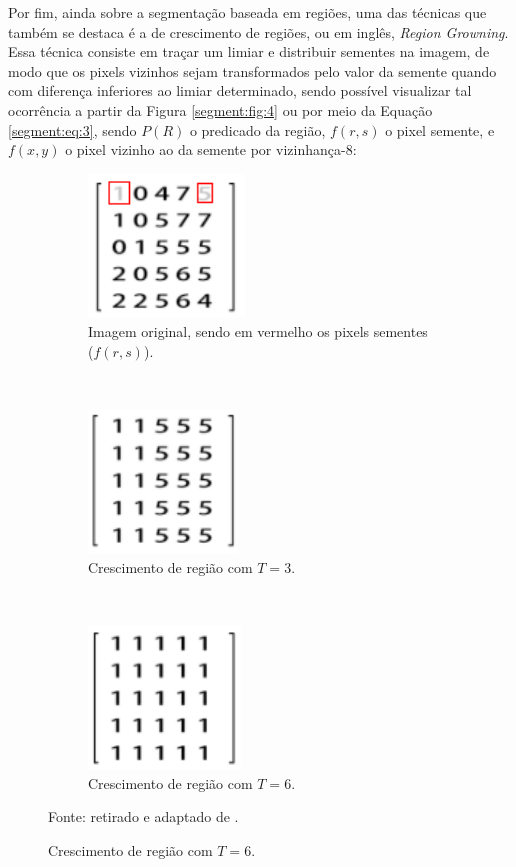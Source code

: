 Por fim, ainda sobre a segmentação baseada em regiões, uma das técnicas que também se destaca é a de crescimento de regiões, ou em inglês, \textit{Region Growning}. Essa técnica consiste em traçar um limiar e distribuir sementes na imagem, de modo que os pixels vizinhos sejam transformados pelo valor da semente quando com diferença inferiores ao limiar determinado, sendo possível visualizar tal ocorrência a partir da Figura \ref{segment:fig:4} ou por meio da Equação \ref{segment:eq:3}, sendo $P(R)$ o predicado da região, $f(r,s)$ o pixel semente, e $f(x,y)$ o pixel vizinho ao da semente por vizinhança-8:

\begin{figure}[H]
   \caption{Crescimento de região.}
   \centering
   \label{segment:fig:4}
    \begin{subfigure}[t]{0.45\textwidth}
        \centering
        \includegraphics[height=1.5in]{recursos/imagens/image_seg/m1.png}
        \caption{Imagem original, sendo em vermelho os pixels sementes ($f(r,s)$).}
        \label{segment:fig:4.1}
    \end{subfigure}
    ~ 
    \begin{subfigure}[t]{0.45\textwidth}
        \centering
        \includegraphics[height=1.5in]{recursos/imagens/image_seg/m2.png}
        \caption{Crescimento de região com $T = 3$.}
        \label{segment:fig:4.2}
    \end{subfigure}
    ~ 

    \begin{subfigure}[t]{0.45\textwidth}
        \centering
        \includegraphics[height=1.5in]{recursos/imagens/image_seg/m3.png}
        \caption{Crescimento de região com $T = 6$.}
        \label{segment:fig:4.3}
    \end{subfigure}

    \vspace*{1 cm}
    Fonte: retirado e adaptado de \cite{Yuheng2017}.
\end{figure}


